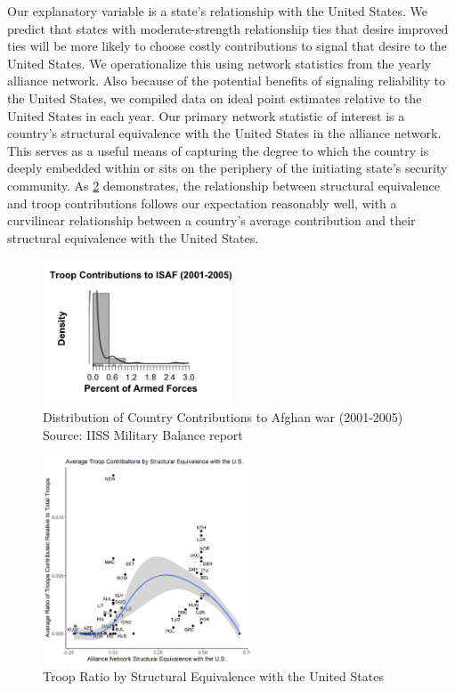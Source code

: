 \documentclass[12pt,letterpaper]{article}
\begin{document}
		Our explanatory variable is a state's relationship with the United States. We predict that states with moderate-strength relationship ties that desire improved ties will be more likely to choose costly contributions to signal that desire to the United States. We operationalize this using network statistics from the yearly alliance network. Also because of the potential benefits of signaling reliability to the United States, we compiled data on ideal point estimates relative to the United States in each year. Our primary network statistic of interest is a country's structural equivalence with the United States in the alliance network. This serves as a useful means of capturing the degree to which the country is deeply embedded within or sits on the periphery of the initiating state's security community. As \ref{fig:contr_sequiv} demonstrates, the relationship between structural equivalence and troop contributions follows our expectation reasonably well, with a curvilinear relationship between a country's average contribution and their structural equivalence with the United States.

			\begin{figure}[H]
			\centering
				\includegraphics[width=0.5\textwidth]{troops_hist_largebin.png}
			\caption{Distribution of Country Contributions to Afghan war (2001-2005) Source: IISS Military Balance report}
			\label{fig:troop_hist}
			\end{figure}


			\begin{figure}[H]
			\centering
				\includegraphics[width=0.55\textwidth]{figures/contributions.png}
			\caption{Troop Ratio by Structural Equivalence with the United States}
			\label{fig:contr_sequiv}
			\end{figure}
\end{document}
